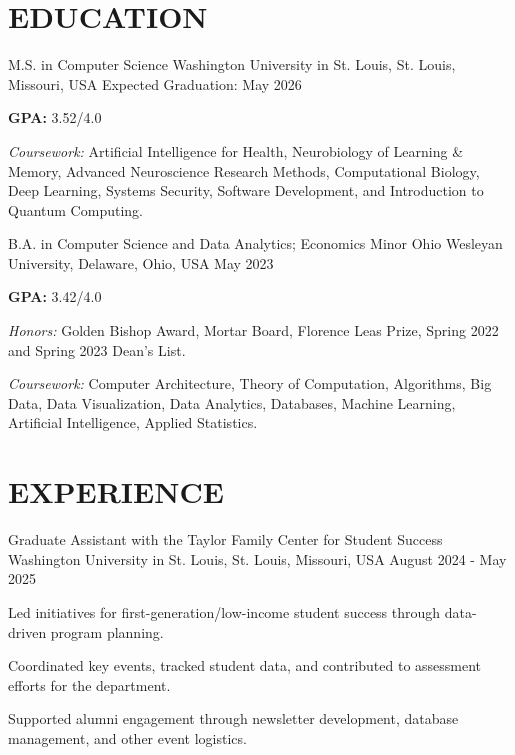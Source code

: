 \documentclass[10pt, letterpaper]{article}
\begin{document}
\section{EDUCATION}

\vspace{\entrySpacing}
\begin{educationentry}
    {M.S. in Computer Science} %
    {Washington University in St. Louis, St. Louis, Missouri, USA} %
    {Expected Graduation: May 2026} %
    \item \textbf{GPA:} 3.52/4.0
    \item \textit{Coursework:} Artificial Intelligence for Health, Neurobiology of Learning \& Memory, Advanced Neuroscience Research Methods, Computational Biology, Deep Learning, Systems Security, Software Development, and Introduction to Quantum Computing.
\end{educationentry}

\vspace{\entrySpacing}
\begin{educationentry}
    {B.A. in Computer Science and Data Analytics; Economics Minor} %
    {Ohio Wesleyan University, Delaware, Ohio, USA} %
    {May 2023} %
    \item \textbf{GPA:} 3.42/4.0
    \item \textit{Honors:} Golden Bishop Award, Mortar Board, Florence Leas Prize, Spring 2022 and Spring 2023 Dean's List.
    \item \textit{Coursework:} Computer Architecture, Theory of Computation, Algorithms, Big Data, Data Visualization, Data Analytics, Databases, Machine Learning, Artificial Intelligence, Applied Statistics.
\end{educationentry}

\vspace{\headerSpacing}

\section{EXPERIENCE}

\vspace{\entrySpacing}
\begin{experienceentry}
    {Graduate Assistant with the Taylor Family Center for Student Success} %
    {Washington University in St. Louis, St. Louis, Missouri, USA} %
    {August 2024 - May 2025} %
    \item Led initiatives for first-generation/low-income student success through data-driven program planning.
    \item Coordinated key events, tracked student data, and contributed to assessment efforts for the department.
    \item Supported alumni engagement through newsletter development, database management, and other event logistics.
\end{experienceentry}
\end{document}
